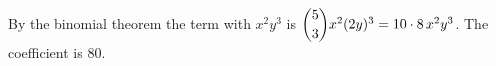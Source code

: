 By the binomial theorem the term with $x^2y^3$ is $\dbinom53x^2(2y)^3=10\cdot8\,x^2y^3$. The coefficient is $\boxed{80}$.

